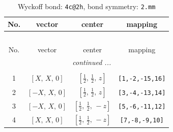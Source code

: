 \documentclass[fleqn,8pt]{jsarticle}
\begin{document}
\renewcommand{\arraystretch}{1.2}
\begin{longtable}{cccc}
\caption{Wyckoff bond: {\tt 4c@2h}, bond symmetry: {\tt 2.mm}}
 \\
 \hline \hline
No. & vector & center & mapping \\ \hline \endfirsthead

\multicolumn{3}{l}{\tablename\ \thetable{}} \\
 \hline \hline
No. & vector & center & mapping \\ \hline \endhead

 \hline \hline
\multicolumn{3}{r}{\footnotesize\it continued ...} \\ \endfoot

 \hline \hline
\multicolumn{3}{r}{} \\ \endlastfoot

1 & $\left[ X,\, X,\, 0 \right]$ & $\left[ \frac{1}{2},\, \frac{1}{2},\, z \right]$ & {\tt [1,-2,-15,16]} \\ \hline
2 & $\left[ - X,\, X,\, 0 \right]$ & $\left[ \frac{1}{2},\, \frac{1}{2},\, z \right]$ & {\tt [3,-4,-13,14]} \\ \hline
3 & $\left[ - X,\, X,\, 0 \right]$ & $\left[ \frac{1}{2},\, \frac{1}{2},\, - z \right]$ & {\tt [5,-6,-11,12]} \\ \hline
4 & $\left[ X,\, X,\, 0 \right]$ & $\left[ \frac{1}{2},\, \frac{1}{2},\, - z \right]$ & {\tt [7,-8,-9,10]} \\
\end{longtable}
\renewcommand{\arraystretch}{1.2}
\end{document}
